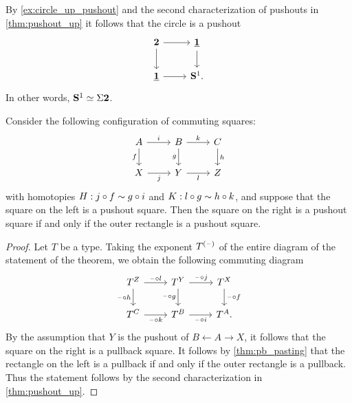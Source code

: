 \begin{eg}\label{eg:circle_pushout}
By \cref{ex:circle_up_pushout} and the second characterization of pushouts in \cref{thm:pushout_up} it follows that the circle is a pushout
\begin{equation*}
\begin{tikzcd}
\bool \arrow[r] \arrow[d] & \unit \arrow[d] \\
\unit \arrow[r] & \sphere{1}.
\end{tikzcd}
\end{equation*}
In other words, $\eqv{\sphere{1}}{\susp{\bool}}$. 
\end{eg}

\begin{thm}\label{thm:pushout_pasting}
Consider the following configuration of commuting squares:
\begin{equation*}
\begin{tikzcd}
A \arrow[r,"i"] \arrow[d,swap,"f"] & B \arrow[r,"k"] \arrow[d,swap,"g"] & C \arrow[d,"h"] \\
X \arrow[r,swap,"j"] & Y \arrow[r,swap,"l"] & Z
\end{tikzcd}
\end{equation*}
with homotopies $H:j\circ f\sim g\circ i$ and $K:l\circ g\sim h\circ k$, and suppose that the square on the left is a pushout square. 
Then the square on the right is a pushout square if and only if the outer rectangle is a pushout square.
\end{thm}

\begin{proof}
Let $T$ be a type. Taking the exponent $T^{(\mathord{\hspace{1pt}\text{--}\hspace{1pt}})}$ of the entire diagram of the statement of the theorem, we obtain the following commuting diagram
\begin{equation*}
\begin{tikzcd}
T^Z \arrow[r,"\blank\circ l"] \arrow[d,swap,"\blank\circ h"] & T^Y \arrow[d,swap,"\blank\circ g"] \arrow[r,"\blank\circ j"] & T^X \arrow[d,"\blank\circ f"] \\
T^C \arrow[r,swap,"\blank\circ k"] & T^B \arrow[r,swap,"\blank\circ i"] & T^A.
\end{tikzcd}
\end{equation*}
By the assumption that $Y$ is the pushout of $B\leftarrow A \rightarrow X$, it follows that the square on the right is a pullback square. It follows by \cref{thm:pb_pasting} that the rectangle on the left is a pullback if and only if the outer rectangle is a pullback. Thus the statement follows by the second characterization in \cref{thm:pushout_up}.
\end{proof}

